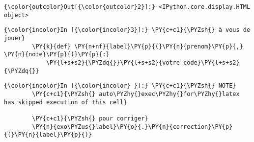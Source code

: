 \begin{Verbatim}[commandchars=\\\{\}]
{\color{outcolor}Out[{\color{outcolor}2}]:} <IPython.core.display.HTML object>
\end{Verbatim}
            
    \begin{Verbatim}[commandchars=\\\{\}]
{\color{incolor}In [{\color{incolor}3}]:} \PY{c+c1}{\PYZsh{} à vous de jouer}
        \PY{k}{def} \PY{n+nf}{label}\PY{p}{(}\PY{n}{prenom}\PY{p}{,} \PY{n}{note}\PY{p}{)}\PY{p}{:}
            \PY{l+s+s2}{\PYZdq{}}\PY{l+s+s2}{votre code}\PY{l+s+s2}{\PYZdq{}}
\end{Verbatim}


    \begin{Verbatim}[commandchars=\\\{\}]
{\color{incolor}In [{\color{incolor} }]:} \PY{c+c1}{\PYZsh{} NOTE}
        \PY{c+c1}{\PYZsh{} auto\PYZhy{}exec\PYZhy{}for\PYZhy{}latex has skipped execution of this cell}
        
        \PY{c+c1}{\PYZsh{} pour corriger}
        \PY{n}{exo\PYZus{}label}\PY{o}{.}\PY{n}{correction}\PY{p}{(}\PY{n}{label}\PY{p}{)}
\end{Verbatim}



    
    
    
